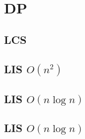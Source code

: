 \section{DP}
    \subsection{LCS}
        
    \subsection{LIS $O(n^2)$}
         
    \subsection{LIS $O(n \log n)$}
        
    \subsection{LIS $O(n \log n)$}
        
%         
%         
%         
%         
%         

